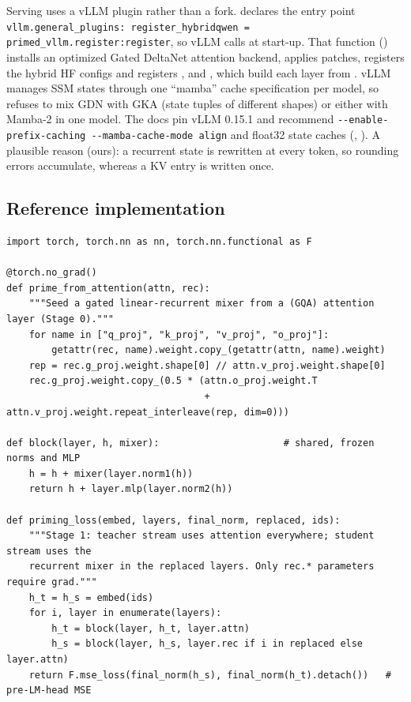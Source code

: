 \begin{implnote}[title={In the code: the vLLM plugin}]
Serving uses a vLLM plugin rather than a fork.  declares the entry
point \texttt{vllm.general\_plugins: register\_hybridqwen = primed\_vllm.register:register}, so vLLM calls
 at start-up. That function ()
installs an optimized Gated DeltaNet attention backend, applies patches, registers the hybrid HF
configs and registers ,  and
, which build each layer from . vLLM
manages SSM states through one ``mamba'' cache specification per model, so
 refuses to mix GDN with GKA (state tuples of different shapes) or either
with Mamba-2 in one model. The docs pin vLLM 0.15.1 and recommend \texttt{-{}-enable-prefix-caching -{}-mamba-cache-mode align} and float32 state caches (,
). A plausible reason (ours): a recurrent state is rewritten at every
token, so rounding errors accumulate, whereas a KV entry is written once.
\end{implnote}

\subsection{Reference implementation}

\begin{lstlisting}[caption={Reference implementation (ours): priming initialization and the fused two-stream distillation loss.},label={lst:c12-prime-ref}]
import torch, torch.nn as nn, torch.nn.functional as F

@torch.no_grad()
def prime_from_attention(attn, rec):
    """Seed a gated linear-recurrent mixer from a (GQA) attention layer (Stage 0)."""
    for name in ["q_proj", "k_proj", "v_proj", "o_proj"]:
        getattr(rec, name).weight.copy_(getattr(attn, name).weight)
    rep = rec.g_proj.weight.shape[0] // attn.v_proj.weight.shape[0]
    rec.g_proj.weight.copy_(0.5 * (attn.o_proj.weight.T
                                   + attn.v_proj.weight.repeat_interleave(rep, dim=0)))

def block(layer, h, mixer):                      # shared, frozen norms and MLP
    h = h + mixer(layer.norm1(h))
    return h + layer.mlp(layer.norm2(h))

def priming_loss(embed, layers, final_norm, replaced, ids):
    """Stage 1: teacher stream uses attention everywhere; student stream uses the
    recurrent mixer in the replaced layers. Only rec.* parameters require grad."""
    h_t = h_s = embed(ids)
    for i, layer in enumerate(layers):
        h_t = block(layer, h_t, layer.attn)
        h_s = block(layer, h_s, layer.rec if i in replaced else layer.attn)
    return F.mse_loss(final_norm(h_s), final_norm(h_t).detach())   # pre-LM-head MSE
\end{lstlisting}

